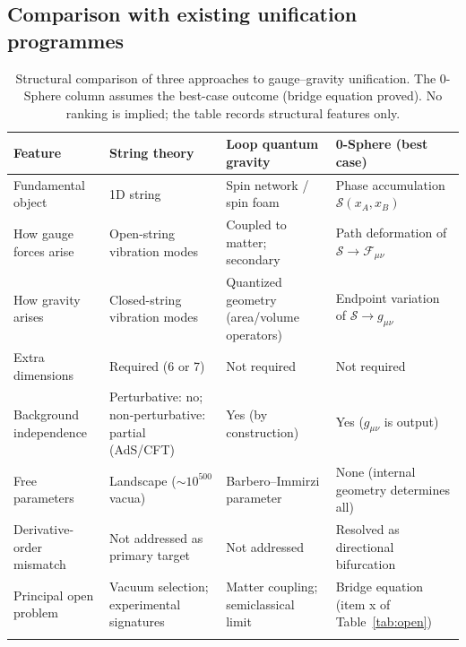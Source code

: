 \documentclass[12pt,letterpaper]{article}
\newcommand{\calS}{\mathcal{S}}
\begin{document}
\subsection{Comparison with existing unification programmes}
\label{subsec:unification}

\begin{table}[t!]
\centering
\renewcommand{\arraystretch}{1.4}
\begin{tabular}{p{3.2cm}p{3.5cm}p{3.5cm}p{4.0cm}}
\toprule
\textbf{Feature}
& \textbf{String theory}
& \textbf{Loop quantum gravity}
& \textbf{0-Sphere (best case)} \\
\midrule
Fundamental object &
  1D string &
  Spin network / spin foam &
  Phase accumulation $\calS(x_A,x_B)$ \\
\addlinespace[0.2cm]
How gauge forces arise &
  Open-string vibration modes &
  Coupled to matter; secondary &
  Path deformation of $\calS\to\mathcal{F}_{\mu\nu}$ \\
\addlinespace[0.2cm]
How gravity arises &
  Closed-string vibration modes &
  Quantized geometry (area/volume operators) &
  Endpoint variation of $\calS\to g_{\mu\nu}$ \\
\addlinespace[0.2cm]
Extra dimensions &
  Required (6 or 7) &
  Not required &
  Not required \\
\addlinespace[0.2cm]
Background independence &
  Perturbative: no; non-perturbative: partial (AdS/CFT) &
  Yes (by construction) &
  Yes ($g_{\mu\nu}$ is output) \\
\addlinespace[0.2cm]
Free parameters &
  Landscape ($\sim10^{500}$ vacua) &
  Barbero--Immirzi parameter &
  None (internal geometry determines all) \\
\addlinespace[0.2cm]
Derivative-order mismatch &
  Not addressed as primary target &
  Not addressed &
  Resolved as directional bifurcation \\
\addlinespace[0.2cm]
Principal open problem &
  Vacuum selection; experimental signatures &
  Matter coupling; semiclassical limit &
  Bridge equation (item x of Table~\ref{tab:open}) \\
\addlinespace[0.2cm]
\bottomrule
\end{tabular}
\caption{Structural comparison of three approaches to gauge--gravity unification.
The 0-Sphere column assumes the best-case outcome (bridge equation proved).
No ranking is implied; the table records structural features only.}
\label{tab:unification}
\end{table}
\end{document}
